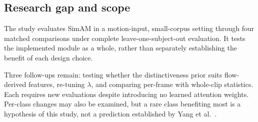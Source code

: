 \subsection{Research gap and scope}
\label{sec:simam-gap}

The study evaluates SimAM in a motion-input, small-corpus setting through four matched comparisons under complete leave-one-subject-out evaluation. It tests the implemented module as a whole, rather than separately establishing the benefit of each design choice.

Three follow-ups remain: testing whether the distinctiveness prior suits flow-derived features, re-tuning $\lambda$, and comparing per-frame with whole-clip statistics. Each requires new evaluations despite introducing no learned attention weights. Per-class changes may also be examined, but a rare class benefiting most is a hypothesis of this study, not a prediction established by Yang et al.~\cite{yang2021}.
